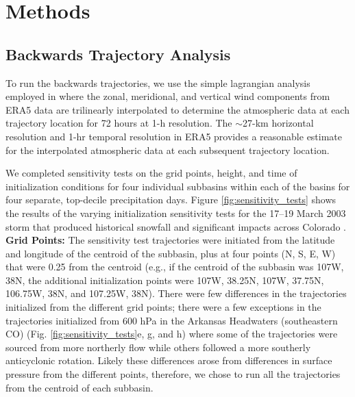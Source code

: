 \documentclass[draft]{agujournal2019}
\begin{document}
\section{Methods}
\label{sec:methods}
\subsection{Backwards Trajectory Analysis}

To run the backwards trajectories, we use the simple lagrangian analysis employed in  where the zonal, meridional, and vertical wind components from ERA5 data are trilinearly interpolated to determine the atmospheric data at each trajectory location for 72 hours at 1-h resolution. The $\sim$27-km horizontal resolution and 1-hr temporal resolution in ERA5 provides a reasonable estimate for the interpolated atmospheric data at each subsequent trajectory location.

We completed sensitivity tests on the grid points, height, and time of initialization conditions for four individual subbasins within each of the basins for four separate, top-decile precipitation days. Figure \ref{fig:sensitivity_tests} shows the results of the varying initialization sensitivity tests for the 17--19 March 2003 storm that produced historical snowfall and significant impacts across Colorado \cite{Wesley2013Extreme2003}. \textbf{Grid Points:} The sensitivity test trajectories were initiated from the latitude and longitude of the centroid of the subbasin, plus at four points (N, S, E, W) that were 0.25\textdegree{} from the centroid (e.g., if the centroid of the subbasin was 107\textdegree W, 38\textdegree N, the additional initialization points were 107\textdegree W, 38.25\textdegree N, 107\textdegree W, 37.75\textdegree N, 106.75\textdegree W, 38\textdegree N, and 107.25\textdegree W, 38\textdegree N). There were few differences in the trajectories initialized from the different grid points; there were a few exceptions in the trajectories initialized from 600 hPa in the Arkansas Headwaters (southeastern CO) (Fig. \ref{fig:sensitivity_tests}e, g, and h) where some of the trajectories were sourced from more northerly flow while others followed a more southerly anticyclonic rotation. Likely these differences arose from differences in surface pressure from the different points, therefore, we chose to run all the trajectories from the centroid of each subbasin.
\end{document}
